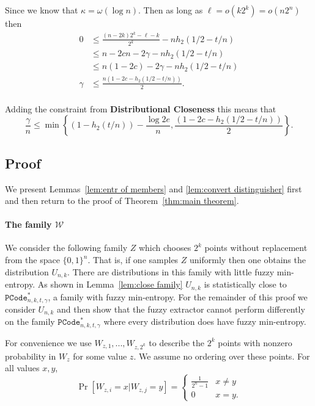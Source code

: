 Since we know that $\kappa =\omega(\log n)$. Then as long as $\ell = o(k 2^k) = o (n2^n)$ then 
\begin{align*}
0 &\le \frac{(n-2k)2^k-\ell-k}{2^k} - nh_2(1/2-t/n) \\
 &\le n-2cn - 2\gamma - nh_2(1/2-t/n) \\
&\le n(1-2c)-2\gamma - nh_2(1/2-t/n)\\
\gamma &\le \frac{n(1-2c - h_2(1/2-t/n))}{2}.\\
\end{align*}

Adding the constraint from \textbf{Distributional Closeness}
this means that 
\[
\frac{\gamma}{n} \le \min\left\{(1-h_2(t/n)) - \frac{\log{2e}}{n}, \frac{(1-2c - h_2(1/2-t/n))}{2}\right\}.
\]


\subsection{Proof}
\noindent
We present Lemmas~\ref{lem:entr of members} and \ref{lem:convert distinguisher} first and then return to the proof of Theorem~\ref{thm:main theorem}.


\paragraph{The family $\mathcal{W}$}
We consider the following family $Z$ which chooses $2^k$ points without replacement from the space $\{0,1\}^n$.  That is, if one samples $Z$ uniformly then one obtains the distribution $U_{n,k}$. There are distributions in this family with little fuzzy min-entropy.  As shown in Lemma~\ref{lem:close family} $U_{n,k}$  is statistically close to $\mathtt{PCode}_{n, k, t, \gamma}^{*}$, a family with fuzzy min-entropy.  For the remainder of this proof we consider $U_{n,k}$ and then show that the fuzzy extractor cannot perform differently on the family $\mathtt{PCode}_{n, k, t, \gamma}^{*}$ where every distribution does have fuzzy min-entropy. 

For convenience we use $W_{z, 1},..., W_{z,2^k}$ to describe the $2^k$ points with nonzero probability in $W_z$ for some value $z$.  We assume no ordering over these points.  For all values $x, y$, 
\[
\Pr[W_{z, i} =x | W_{z, j} = y] = \begin{cases} \frac{1}{2^n-1} &x\neq y\\0&x=y.\end{cases}
\]

